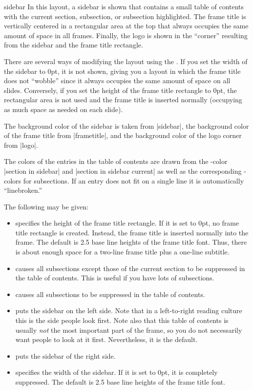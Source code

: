 \begin{outerthemeexample}{sidebar}
  In this layout, a sidebar is shown that contains a small table of contents with the current section, subsection, or subsection highlighted. The frame title is vertically centered in a rectangular area at the top that always occupies the same amount of space in all frames. Finally, the logo is shown in the ``corner'' resulting from the sidebar and the frame title rectangle.

  There are several ways of modifying the layout using the . If you set the width of the sidebar to 0pt, it is not shown, giving you a layout in which the frame title does not ``wobble'' since it always occupies the same amount of space on all slides. Conversely, if you set the height of the frame title rectangle to 0pt, the rectangular area is not used and the frame title is inserted normally (occupying as much space as needed on each slide).

  The background color of the sidebar is taken from |sidebar|, the background color of the frame title from |frametitle|, and the background color of the logo corner from |logo|.

  The colors of the entries in the table of contents are drawn from the \beamer-color |section in sidebar| and |section in sidebar current| as well as the corresponding \beamer-colors for subsections. If an entry does not fit on a single line it is automatically ``linebroken.''

  The following  may be given:
  \begin{itemize}
  \item
     specifies the height of the frame title rectangle. If it is set to 0pt, no frame title rectangle is created. Instead, the frame title is inserted normally into the frame. The default is 2.5 base line heights of the frame title font. Thus, there is about enough space for a two-line frame title plus a one-line subtitle.
  \item
     causes all subsections except those of the current section to be suppressed in the table of contents. This is useful if you have lots of subsections.
  \item
     causes all subsections to be suppressed in the table of contents.
  \item
     puts the sidebar on the left side. Note that in a left-to-right reading culture this is the side people look first. Note also that this table of contents is usually \emph{not} the most important part of the frame, so you do not necessarily want people to look at it first. Nevertheless, it is the default.
  \item
     puts the sidebar of the right side.
  \item
     specifies the width of the sidebar. If it is set to 0pt, it is completely suppressed. The default is 2.5 base line heights of the frame title font.
  \end{itemize}
\end{outerthemeexample}

